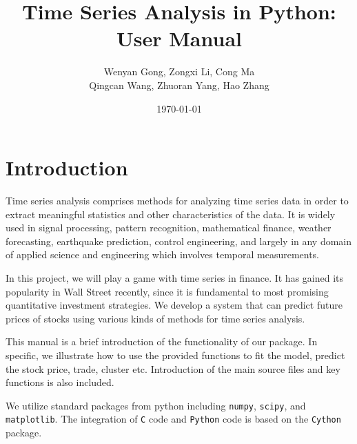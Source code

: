 \documentclass[12pt,a4paper]{article}
\title{\Huge  Time Series Analysis in Python: User Manual}
\author{Wenyan Gong, Zongxi Li, Cong Ma
\\Qingcan Wang, Zhuoran Yang, Hao Zhang}
\date{\today}
\begin{document}
\maketitle

\section{Introduction}
Time series analysis comprises methods for analyzing time series data in order to extract meaningful statistics and other characteristics of the data. It is widely used in signal processing, pattern recognition, mathematical finance, weather forecasting, earthquake prediction, control engineering, and largely in any domain of applied science and engineering which involves temporal measurements.

In this project, we will play a game with time series in finance. It has gained its popularity in Wall Street recently, since it is fundamental to most promising quantitative investment strategies. We develop a system that can predict future prices of stocks using various kinds of methods for time series analysis. 

This manual is a brief introduction of the functionality of our package. In specific,  we illustrate  how to use the provided functions to fit the model, predict the stock price, trade, cluster etc. Introduction of the main source files and key functions is also included.

We  utilize standard packages from python including \texttt{numpy}, \texttt{scipy}, and \texttt{matplotlib}. The integration of \texttt{C} code  and \texttt{Python} code is based on the \texttt{Cython} package.
\end{document}
